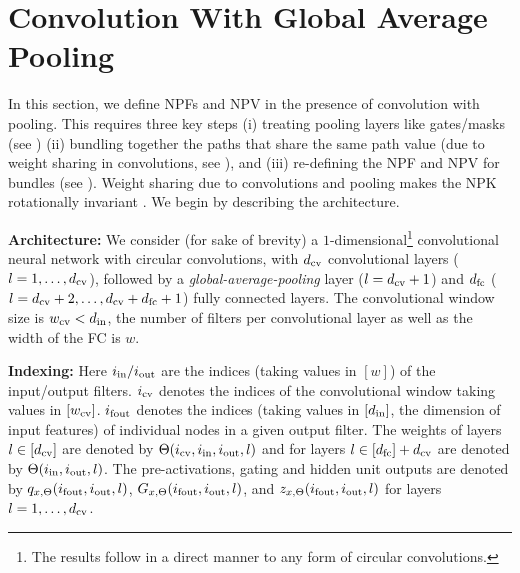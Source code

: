 \newpage
\appendix
\section{Convolution With Global Average Pooling}\label{sec:conv}
In this section, we define NPFs and NPV in the presence of convolution with pooling. This requires three key steps (i) treating pooling layers like gates/masks (see ) (ii) bundling together the paths that share the same path value
(due to weight sharing in convolutions, see ),  and (iii) re-defining the NPF and NPV for bundles (see ). Weight sharing due to convolutions and pooling makes the NPK rotationally invariant . We begin by describing the architecture.

\textbf{Architecture:} We consider (for sake of brevity) a $1$-dimensional\footnote{The results follow in a direct manner to any form of circular convolutions.} convolutional neural network with circular convolutions, with $d_{\text{cv}}$ convolutional layers ($l=1,\ldots,d_{\text{cv}}$), followed by a \emph{global-average-pooling} layer ($l=d_{\text{cv}}+1$) and $d_{\text{fc}}$ ($l=d_{\text{cv}}+2,\ldots,d_{\text{cv}}+d_{\text{fc}}+1$) fully connected  layers. The convolutional window size is $w_{\text{cv}}<d_{\text{in}}$, the number of filters per convolutional layer as well as the width of the FC is $w$. 

\textbf{Indexing:} Here $i_{\text{in}}/i_{\text{out}}$ are the indices (taking values in $[w]$) of the input/output filters. $i_{\text{cv}}$ denotes the indices of the convolutional window taking values in $[w_{\text{cv}}]$. $i_{\text{fout}}$ denotes the indices (taking values in $[d_{\text{in}}]$, the dimension of input features) of individual nodes in a given output filter. The weights of layers $l\in[d_{\text{cv}}]$ are denoted by $\Theta(i_{\text{cv}},i_{\text{in}},i_{\text{out}},l)$ and for layers $l\in[d_{\text{fc}}]+d_{\text{cv}}$ are denoted by $\Theta(i_{\text{in}},i_{\text{out}},l)$. The pre-activations, gating and hidden unit outputs are denoted by $q_{x,\Theta}(i_{\text{fout}},i_{\text{out}},l)$,  $G_{x,\Theta}(i_{\text{fout}},i_{\text{out}},l)$, and $z_{x,\Theta}(i_{\text{fout}},i_{\text{out}},l)$ for layers $l=1,\ldots, d_{\text{cv}}$.

